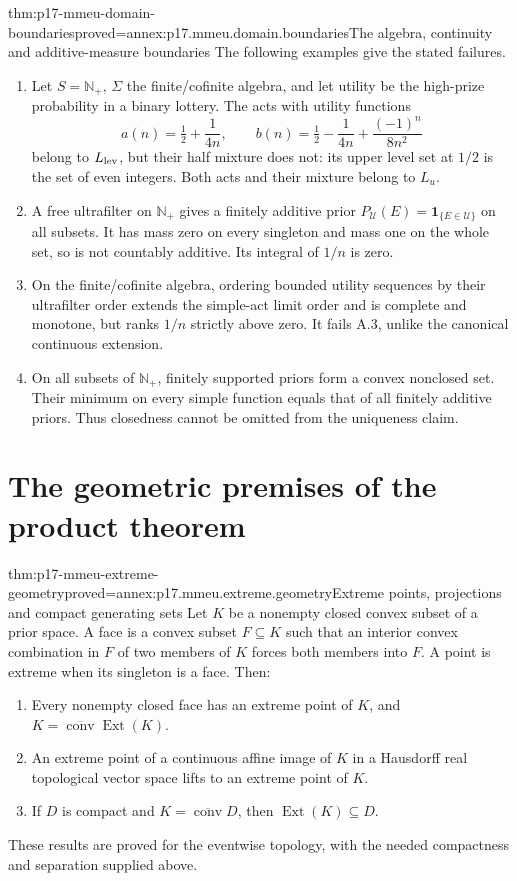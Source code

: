 \begin{hbtheorem}{thm:p17-mmeu-domain-boundaries}{proved=annex:p17.mmeu.domain.boundaries}{The algebra, continuity and additive-measure boundaries}
The following examples give the stated failures.
\begin{enumerate}
\item Let \(S=\mathbb N_+\), \(\Sigma\) the finite/cofinite algebra,
and let utility be the high-prize probability in a binary lottery.
The acts with utility functions
\[
 a(n)=\tfrac12+\frac1{4n},\qquad
 b(n)=\tfrac12-\frac1{4n}+\frac{(-1)^n}{8n^2}
\]
belong to \(L_{\rm lev}\), but their half mixture does not:
its upper level set at \(1/2\) is the set of even integers.
Both acts and their mixture belong to \(L_u\).
\item A free ultrafilter on \(\mathbb N_+\) gives a finitely
additive prior \(P_{\mathcal U}(E)=\mathbf1_{\{E\in\mathcal U\}}\)
on all subsets. It has mass zero on every singleton and mass
one on the whole set, so is not countably additive.
Its integral of \(1/n\) is zero.
\item On the finite/cofinite algebra, ordering bounded utility
sequences by their ultrafilter order extends the simple-act
limit order and is complete and monotone, but ranks \(1/n\)
strictly above zero. It fails A.3, unlike the canonical
continuous extension.
\item On all subsets of \(\mathbb N_+\), finitely supported
priors form a convex nonclosed set. Their minimum on every
simple function equals that of all finitely additive priors.
Thus closedness cannot be omitted from the uniqueness claim.
\end{enumerate}
\end{hbtheorem}

\section{The geometric premises of the product theorem}

\begin{hbtheorem}{thm:p17-mmeu-extreme-geometry}{proved=annex:p17.mmeu.extreme.geometry}{Extreme points, projections and compact generating sets}
Let \(K\) be a nonempty closed convex subset of a prior space.
A face is a convex subset \(F\subseteq K\) such that an
interior convex combination in \(F\) of two members of \(K\)
forces both members into \(F\).
A point is extreme when its singleton is a face.
Then:
\begin{enumerate}
\item Every nonempty closed face has an extreme point of \(K\),
and \(K=\overline{\operatorname{conv}}\operatorname{Ext}(K)\).
\item An extreme point of a continuous affine image of \(K\)
in a Hausdorff real topological vector space
lifts to an extreme point of \(K\).
\item If \(D\) is compact and \(K=\overline{\operatorname{conv}}D\),
then \(\operatorname{Ext}(K)\subseteq D\).
\end{enumerate}
These results are proved for the eventwise topology, with
the needed compactness and separation supplied above.
\end{hbtheorem}

